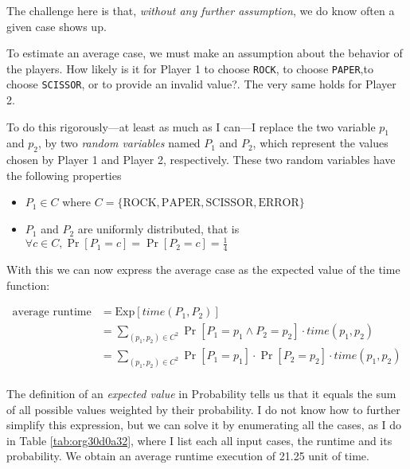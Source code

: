 \documentclass[11pt]{article}
\begin{document}
The challenge here is that, \emph{without any further assumption}, we do know
often a given case shows up.

To estimate an average case, we must make an assumption about the
behavior of the players. How likely is it for Player 1 to choose
\texttt{ROCK}, to choose \texttt{PAPER},to choose \texttt{SCISSOR}, or to provide an
invalid value?. The very same holds for Player 2.


To do this rigorously---at least as much as I can---I replace the two
variable \(p_1\) and \(p_2\), by two \emph{random variables} named \(P_1\) and
\(P_2\), which represent the values chosen by Player 1 and Player 2,
respectively. These two random variables have the following properties
\begin{itemize}
\item \(P_1 \in C\) where \(C = \{\text{ROCK}, \text{PAPER}, \text{SCISSOR}, \text{ERROR}\}\)
\item \(P_1\) and \(P_2\) are uniformly distributed, that is \(\forall c \in C, \Pr[P_1 =
   c] = \Pr[P_2=c] = \frac{1}{4}\)
\end{itemize}

With this we can now express the average case as the expected value of
the time function:

\begin{align*}
    \text{average runtime} &= \text{Exp}[time(P_1, P_2)] \\
                           &= \sum_{(p_1, p_2) \in C^2} \Pr[P_1=p_1 \land P_2=p_2] \cdot time(p_1, p_2) \\
                           &= \sum_{(p_1, p_2) \in C^2} \Pr[P_1=p_1] \cdot \Pr[P_2=p_2] \cdot time(p_1, p_2) \\
\end{align*}

The definition of an \emph{expected value} in Probability tells us that it
equals the sum of all possible values weighted by their probability. I
do not know how to further simplify this expression, but we can solve
it by enumerating all the cases, as I do in Table \ref{tab:org30d0a32}, where I
list each all input cases, the runtime and its probability. We obtain
an average runtime execution of 21.25 unit of time.
\end{document}
